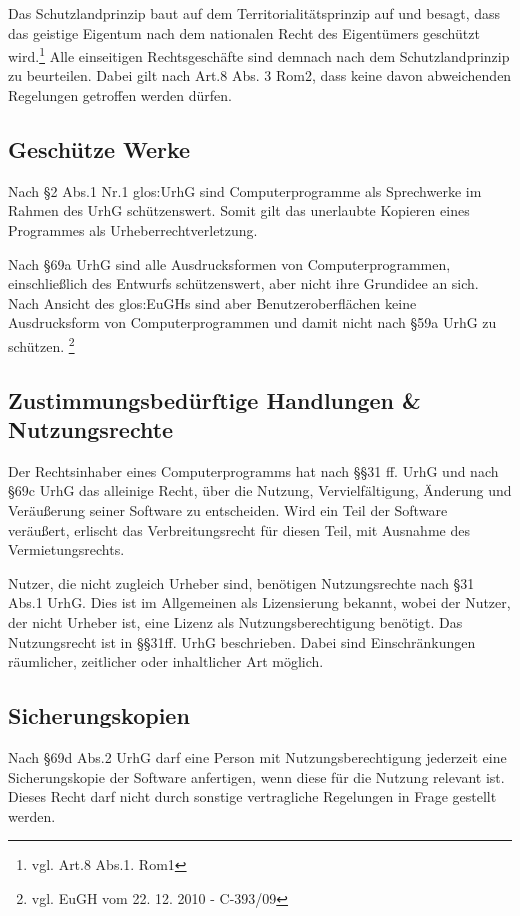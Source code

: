 Das Schutzlandprinzip baut auf dem Territorialit\"atsprinzip auf und besagt, dass das geistige Eigentum nach dem nationalen Recht des Eigent\"umers gesch\"utzt wird.\footnote{vgl. Art.8 Abs.1. Rom1} Alle einseitigen Rechtsgesch\"afte sind demnach nach dem Schutzlandprinzip zu beurteilen. Dabei gilt nach Art.8 Abs. 3 Rom2, dass keine davon abweichenden Regelungen getroffen werden d\"urfen.    
   \label{territorialitaets_u_schutzlandprinzip}

\subsection{Gesch\"utze Werke}
Nach §2 Abs.1 Nr.1 \gls{glos:UrhG} sind Computerprogramme als Sprechwerke im Rahmen des UrhG sch\"utzenswert. Somit gilt das unerlaubte Kopieren eines Programmes als Urheberrechtverletzung.
   \label{geschuetzte_werke}\newline

Nach §69a UrhG sind alle Ausdrucksformen von Computerprogrammen, einschlie{\ss}lich des Entwurfs sch\"utzenswert, aber nicht ihre Grundidee an sich. Nach Ansicht des \gls{glos:EuGH}s sind aber Benutzeroberfl\"achen keine Ausdrucksform von Computerprogrammen und damit nicht nach §59a UrhG zu sch\"utzen. \footnote{vgl. EuGH vom 22. 12. 2010 - C-393/09}
  \label{gegenstand_des_schutzes}

\subsection{Zustimmungsbed\"urftige Handlungen \& Nutzungsrechte}
Der Rechtsinhaber eines Computerprogramms hat nach §§31 ff. UrhG und nach §69c UrhG das alleinige Recht, \"uber die Nutzung, Vervielf\"altigung, \"Anderung und Ver\"au{\ss}erung seiner Software zu entscheiden. Wird ein Teil der Software ver\"au{\ss}ert, erlischt das Verbreitungsrecht f\"ur diesen Teil, mit Ausnahme des Vermietungsrechts.\newline

Nutzer, die nicht zugleich Urheber sind, ben\"otigen Nutzungsrechte nach §31 Abs.1 UrhG. Dies ist im Allgemeinen als Lizensierung bekannt, wobei der Nutzer, der nicht Urheber ist, eine Lizenz als Nutzungsberechtigung ben\"otigt. Das Nutzungsrecht ist in §§31ff. UrhG beschrieben. Dabei sind Einschr\"ankungen r\"aumlicher, zeitlicher oder inhaltlicher Art m\"oglich. 
 \label{zustimmungsbeduerftige_handlungen_nutzungsrechte}

\subsection{Sicherungskopien}
Nach §69d Abs.2 UrhG darf eine Person mit Nutzungsberechtigung jederzeit eine Sicherungskopie der Software anfertigen, wenn diese f\"ur die Nutzung relevant ist. Dieses Recht darf nicht durch sonstige vertragliche Regelungen in Frage gestellt werden.
 \label{sicherungskopien}
